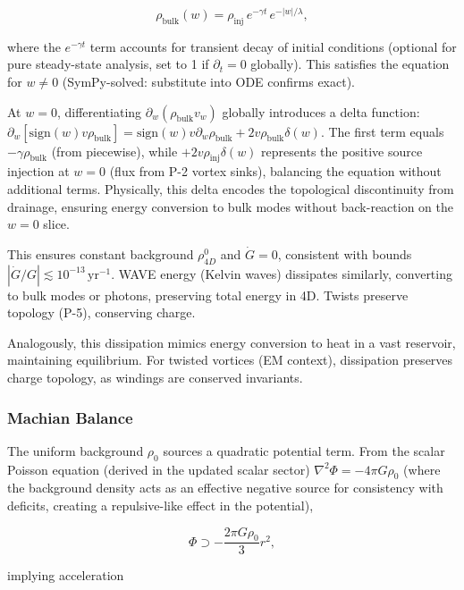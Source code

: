 \begin{equation}
\rho_{\text{bulk}}(w) = \rho_{\text{inj}} \, e^{-\gamma t} \, e^{-|w| / \lambda},
\end{equation}

where the $e^{-\gamma t}$ term accounts for transient decay of initial conditions (optional for pure steady-state analysis, set to 1 if $\partial_t = 0$ globally). This satisfies the equation for $w \neq 0$ (SymPy-solved: substitute into ODE confirms exact).

At $w=0$, differentiating $\partial_w (\rho_{\text{bulk}} v_w)$ globally introduces a delta function: $\partial_w [\text{sign}(w) v \rho_{\text{bulk}}] = \text{sign}(w) v \partial_w \rho_{\text{bulk}} + 2 v \rho_{\text{bulk}} \delta(w)$. The first term equals $-\gamma \rho_{\text{bulk}}$ (from piecewise), while $+2 v \rho_{\text{inj}} \delta(w)$ represents the positive source injection at $w=0$ (flux from P-2 vortex sinks), balancing the equation without additional terms. Physically, this delta encodes the topological discontinuity from drainage, ensuring energy conversion to bulk modes without back-reaction on the $w=0$ slice.

This ensures constant background $\rho_{4D}^0$ and $\dot{G} = 0$, consistent with bounds $|\dot{G}/G| \lesssim 10^{-13} \, \mathrm{yr}^{-1}$. WAVE energy (Kelvin waves) dissipates similarly, converting to bulk modes or photons, preserving total energy in 4D. Twists preserve topology (P-5), conserving charge.

Analogously, this dissipation mimics energy conversion to heat in a vast reservoir, maintaining equilibrium. For twisted vortices (EM context), dissipation preserves charge topology, as windings are conserved invariants.

\subsubsection{Machian Balance}
The uniform background $\rho_0$ sources a quadratic potential term. From the scalar Poisson equation (derived in the updated scalar sector) $\nabla^2 \Phi = -4\pi G \rho_0$ (where the background density acts as an effective negative source for consistency with deficits, creating a repulsive-like effect in the potential),

\begin{equation}
\Phi \supset -\frac{2\pi G \rho_0}{3} r^2,
\end{equation}

implying acceleration

